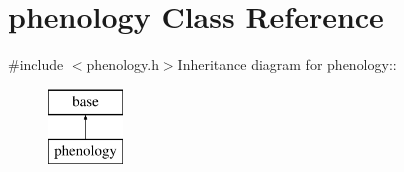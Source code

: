 \hypertarget{classphenology}{
\section{phenology Class Reference}
\label{classphenology}
}


{\ttfamily \#include $<$phenology.h$>$}Inheritance diagram for phenology::\begin{figure}[H]
\begin{center}
\leavevmode
\includegraphics[height=2cm]{classphenology}
\end{center}
\end{figure}
